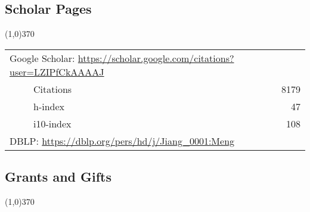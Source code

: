 \documentclass[10pt]{article}
\begin{document}
\subsection{\sc Scholar Pages}
\vspace{-0.4cm} \line(1,0){370} \vspace{-0.1cm}

\begin{table}[h!]
\begin{tabular*}{12.7cm}{p{11.65cm}r}
\multicolumn{2}{l}{Google Scholar: \url{https://scholar.google.com/citations?user=LZIPfCkAAAAJ}} \\
~~~~~Citations & 8179 \\
~~~~~h-index & 47 \\
~~~~~i10-index & 108 \\
\multicolumn{2}{l}{DBLP: \url{https://dblp.org/pers/hd/j/Jiang\_0001:Meng}} \\
\end{tabular*}
\end{table}

\subsection{\sc Grants and Gifts}
\vspace{-0.4cm} \line(1,0){370} \vspace{-0.1cm}
\end{document}

